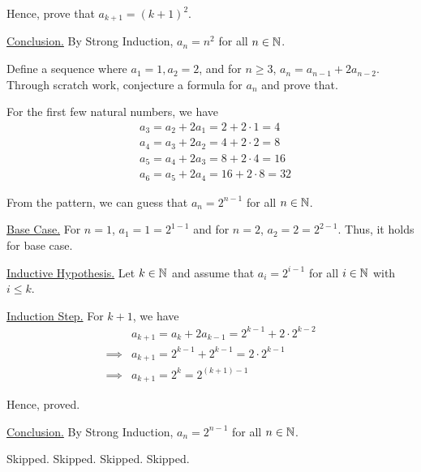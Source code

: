 	Hence, prove that $a_{k+1} = (k+1)^2$.

	\underline{Conclusion.} By Strong Induction, $a_n = n^2$ for all $n \in \mathbb{N}$.
	\es
	
\item Define a sequence where $a_1 = 1, a_2 = 2$, and for $n \geq 3$, $a_n = a_{n-1} + 2a_{n-2}$. 
	Through scratch work, conjecture a formula for $a_n$ and prove that.
	
	\begin{scratch}
		For the first few natural numbers, we have
		\begin{align*}
			&a_3 = a_2 + 2a_1 = 2 + 2 \cdot 1 = 4 \\
			&a_4 = a_3 + 2a_2 = 4 + 2 \cdot 2 = 8 \\
			&a_5 = a_4 + 2a_3 = 8 + 2 \cdot 4 = 16 \\
			&a_6 = a_5 + 2a_4 = 16 + 2 \cdot 8 = 32 
		\end{align*}

		From the pattern, we can guess that $a_n = 2^{n-1}$ for all $n \in \mathbb{N}$.
	\end{scratch}

	\bs
	\underline{Base Case.} For $n = 1$, $a_1 = 1 = 2^{1-1}$ and for $n = 2$, $a_2 = 2 = 2^{2-1}$. Thus, it holds for base case.

	\underline{Inductive Hypothesis.} Let $k \in \mathbb{N}$ and assume that $a_i = 2^{i-1}$ for all $i \in \mathbb{N}$ with $i \leq k$.

	\underline{Induction Step.} For $k+1$, we have
	\begin{align*}
		&a_{k+1} = a_{k} + 2a_{k-1} = 2^{k-1} + 2 \cdot 2^{k-2} \\
		\implies &a_{k+1}	= 2^{k-1} + 2^{k-1} = 2 \cdot 2^{k-1} \\
		\implies &a_{k+1} = 2^{k} = 2^{(k+1)-1}
	\end{align*}

	Hence, proved.

	\underline{Conclusion.} By Strong Induction, $a_n = 2^{n-1}$ for all $n \in \mathbb{N}$.
	\es
\enum
\ep

\bp Skipped. \ep
\bp Skipped. \ep
\bp Skipped. \ep
\bp Skipped. \ep
